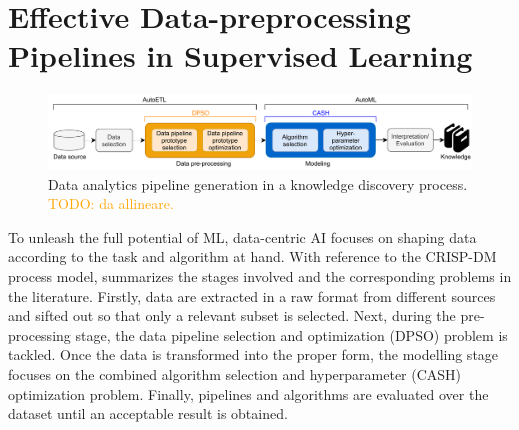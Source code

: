 
\chapter{Effective Data-preprocessing Pipelines in Supervised Learning}
\label{data-centric-chap:supervised}

\begin{figure}[t]
    \centering
    \includegraphics[width=1.0\textwidth]{chapters/data-centric/supervised/img/data-analytics-pipeline.pdf}
    \caption{Data analytics pipeline generation in a knowledge discovery process. \textcolor{orange}{TODO: da allineare.}}
    \label{fig:data-analytics-pipeline}
\end{figure}

To unleash the full potential of ML, data-centric AI focuses on shaping data according to the task and algorithm at hand.
With reference to the CRISP-DM process model,   summarizes the stages involved and the corresponding problems in the literature.
Firstly, data are extracted in a raw format from different sources and sifted out so that only a relevant subset is selected.
Next, during the pre-processing stage, the data pipeline selection and optimization (DPSO) \cite{Quemy19DOLAP} problem is tackled.
Once the data is transformed into the proper form, the modelling stage focuses on the combined algorithm selection and hyperparameter (CASH) optimization problem.
Finally, pipelines and algorithms
are evaluated over the dataset until an acceptable result is obtained.



